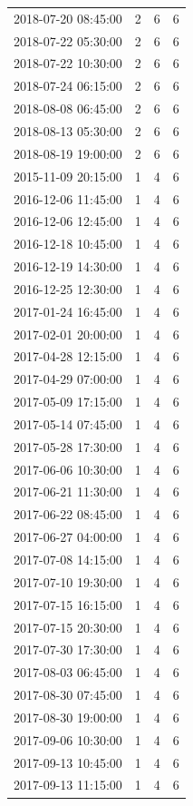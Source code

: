 \begin{tabular}{lrrr}
2018-07-20 08:45:00 & 2 & 6 & 6 \\
2018-07-22 05:30:00 & 2 & 6 & 6 \\
2018-07-22 10:30:00 & 2 & 6 & 6 \\
2018-07-24 06:15:00 & 2 & 6 & 6 \\
2018-08-08 06:45:00 & 2 & 6 & 6 \\
2018-08-13 05:30:00 & 2 & 6 & 6 \\
2018-08-19 19:00:00 & 2 & 6 & 6 \\
2015-11-09 20:15:00 & 1 & 4 & 6 \\
2016-12-06 11:45:00 & 1 & 4 & 6 \\
2016-12-06 12:45:00 & 1 & 4 & 6 \\
2016-12-18 10:45:00 & 1 & 4 & 6 \\
2016-12-19 14:30:00 & 1 & 4 & 6 \\
2016-12-25 12:30:00 & 1 & 4 & 6 \\
2017-01-24 16:45:00 & 1 & 4 & 6 \\
2017-02-01 20:00:00 & 1 & 4 & 6 \\
2017-04-28 12:15:00 & 1 & 4 & 6 \\
2017-04-29 07:00:00 & 1 & 4 & 6 \\
2017-05-09 17:15:00 & 1 & 4 & 6 \\
2017-05-14 07:45:00 & 1 & 4 & 6 \\
2017-05-28 17:30:00 & 1 & 4 & 6 \\
2017-06-06 10:30:00 & 1 & 4 & 6 \\
2017-06-21 11:30:00 & 1 & 4 & 6 \\
2017-06-22 08:45:00 & 1 & 4 & 6 \\
2017-06-27 04:00:00 & 1 & 4 & 6 \\
2017-07-08 14:15:00 & 1 & 4 & 6 \\
2017-07-10 19:30:00 & 1 & 4 & 6 \\
2017-07-15 16:15:00 & 1 & 4 & 6 \\
2017-07-15 20:30:00 & 1 & 4 & 6 \\
2017-07-30 17:30:00 & 1 & 4 & 6 \\
2017-08-03 06:45:00 & 1 & 4 & 6 \\
2017-08-30 07:45:00 & 1 & 4 & 6 \\
2017-08-30 19:00:00 & 1 & 4 & 6 \\
2017-09-06 10:30:00 & 1 & 4 & 6 \\
2017-09-13 10:45:00 & 1 & 4 & 6 \\
2017-09-13 11:15:00 & 1 & 4 & 6 \\

\end{tabular}
